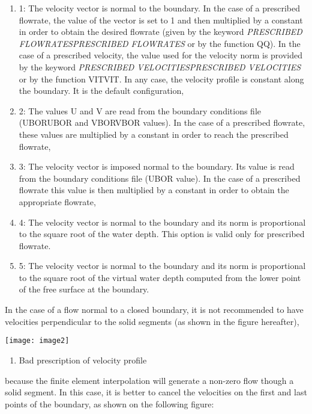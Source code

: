 \documentclass{article} %
\begin{document}
\begin{enumerate}
\item  1: The velocity vector is normal to the boundary. In the case of a prescribed flowrate, the value of the vector is set to 1 and then multiplied by a constant in order to obtain the desired flowrate (given by the keyword \textit{PRESCRIBED FLOWRATESPRESCRIBED FLOWRATES} or by the function QQ). In the case of a prescribed velocity, the value used for the velocity norm is provided by the keyword \textit{PRESCRIBED VELOCITIESPRESCRIBED VELOCITIES} or by the function VITVIT. In any case, the velocity profile is constant along the boundary. It is the default configuration,

\item  2: The values U and V are read from the boundary conditions file (UBORUBOR and VBORVBOR values). In the case of a prescribed flowrate, these values are multiplied by a constant in order to reach the prescribed flowrate,

\item  3: The velocity vector is imposed normal to the boundary. Its value is read from the boundary conditions file (UBOR value). In the case of a prescribed flowrate this value is then multiplied by a constant in order to obtain the appropriate flowrate,

\item  4: The velocity vector is normal to the boundary and its norm is proportional to the square root of the water depth. This option is valid only for prescribed flowrate.

\item  5: The velocity vector is normal to the boundary and its norm is proportional to the square root of the virtual water depth computed from the lower point of the free surface at the boundary.
\end{enumerate}

 In the case of a flow normal to a closed boundary, it is not recommended to have velocities perpendicular to the solid segments (as shown in the figure hereafter),

 \texttt{[image: image2]}

\begin{enumerate}
\item  Bad prescription of velocity profile
\end{enumerate}

 because the finite element interpolation will generate a non-zero flow though a solid segment. In this case, it is better to cancel the velocities on the first and last points of the boundary, as shown on the following figure:
\end{document}

